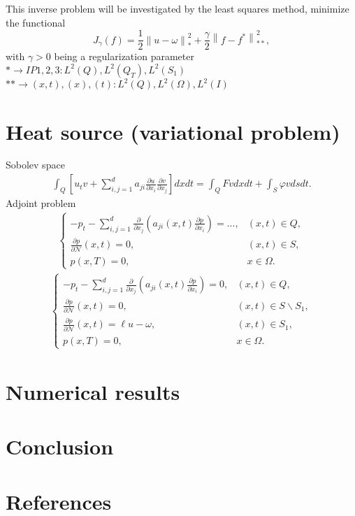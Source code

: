 \documentclass[]{article}
\begin{document}
This inverse problem will be investigated by the least squares method, minimize the functional
$$J_{\gamma}(f)=\frac{1}{2}\left\|u-\omega\right\|_{*}^2+\frac{\gamma}{2}\left\|f-f^*\right\|_{**}^2,$$
with $\gamma>0$ being a regularization parameter\\
$*\to IP1, 2, 3: L^2(Q), L^2(Q_T), L^2(S_1)$\\
$** \to (x, t), (x), (t): L^2(Q), L^2(\Omega), L^2(I)$

\section{Heat source (variational problem)}
Sobolev space
\begin{align}
	\int_{Q}\left[u_tv+\sum_{i, j=1}^{d}a_{ji}\frac{\partial u}{\partial x_i}\frac{\partial v}{\partial x_j}\right]dxdt=\int_{Q}Fvdxdt+\int_{S}\varphi vdsdt.
\end{align}
Adjoint problem
\begin{align}
	\begin{cases}
		-p_t-\sum_{i, j=1}^{d}\frac{\partial}{\partial x_j}\left(a_{ji}(x, t)\frac{\partial p}{\partial x_i}\right)=..., & (x, t)\in Q,\\
		\frac{\partial p}{\partial \mathcal{N}}(x, t)=0, & (x, t)\in S,\\
		p(x, T)=0, & x\in \Omega.
	\end{cases}
\end{align}
\begin{align}
	\begin{cases}
		-p_t-\sum_{i, j=1}^{d}\frac{\partial}{\partial x_j}\left(a_{ji}(x, t)\frac{\partial p}{\partial x_i}\right)=0, & (x, t)\in Q,\\
		\frac{\partial p}{\partial \mathcal{N}}(x, t)=0, & (x, t)\in S\backslash S_1,\\[0.2cm]
		\frac{\partial p}{\partial \mathcal{N}}(x, t)=\ell u-\omega, & (x, t)\in S_1,\\
		p(x, T)=0, & x\in \Omega.
	\end{cases}
\end{align}
\section{Numerical results}
\section{Conclusion}
\section{References}
\end{document}

